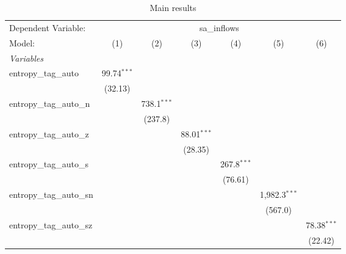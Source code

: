
\begin{table}[htbp]
   \centering
   \footnotesize
   \begin{threeparttable}[b]
      \caption{\label{tab:reg_sa_inflows_tag_auto.tex} Main results}
      \begin{tabular}{lcccccc}
         \tabularnewline \midrule \midrule
         Dependent Variable: & \multicolumn{6}{c}{sa\_inflows}\\
         Model:                    & (1)            & (2)            & (3)            & (4)            & (5)             & (6)\\  
         \midrule
         \emph{Variables}\\
         entropy\_tag\_auto        & 99.74$^{***}$  &                &                &                &                 &   \\   
                                   & (32.13)        &                &                &                &                 &   \\   
         entropy\_tag\_auto\_n     &                & 738.1$^{***}$  &                &                &                 &   \\   
                                   &                & (237.8)        &                &                &                 &   \\   
         entropy\_tag\_auto\_z     &                &                & 88.01$^{***}$  &                &                 &   \\   
                                   &                &                & (28.35)        &                &                 &   \\   
         entropy\_tag\_auto\_s     &                &                &                & 267.8$^{***}$  &                 &   \\   
                                   &                &                &                & (76.61)        &                 &   \\   
         entropy\_tag\_auto\_sn    &                &                &                &                & 1,982.3$^{***}$ &   \\   
                                   &                &                &                &                & (567.0)         &   \\   
         entropy\_tag\_auto\_sz    &                &                &                &                &                 & 78.38$^{***}$\\   
                                   &                &                &                &                &                 & (22.42)\\   

\end{tabular}
\end{threeparttable}
\end{table}
